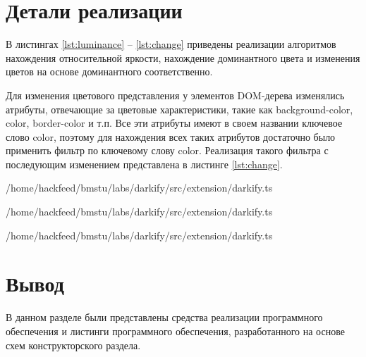\section{Детали реализации}

В листингах \ref{lst:luminance} -- \ref{lst:change} приведены реализации алгоритмов нахождения относительной яркости, нахождение доминантного цвета и изменения цветов на основе доминантного соответственно. 

Для изменения цветового представления у элементов DOM-дерева изменялись атрибуты, отвечающие за цветовые характеристики, такие как background-color, color, border-color и т.п. Все эти атрибуты имеют в своем названии ключевое слово color, поэтому для нахождения всех таких атрибутов достаточно было применить фильтр по ключевому слову color. Реализация такого фильтра с последующим изменением представлена в листинге \ref{lst:change}.

\begin{lstinputlisting}[
	caption={Реализация алгоритма нахождения относительной яркости},
	label={lst:luminance},
	style={ES6},
	linerange={80-91},
	]{/home/hackfeed/bmstu/labs/darkify/src/extension/darkify.ts}
\end{lstinputlisting}

\begin{lstinputlisting}[
	caption={Реализация алгоритма нахождения доминантного цвета},
	label={lst:domcolor},
	style={ES6},
	linerange={100-127},
	]{/home/hackfeed/bmstu/labs/darkify/src/extension/darkify.ts}
\end{lstinputlisting}

\begin{lstinputlisting}[
	caption={Реализация алгоритма подбора цветов на основе базовго},
	label={lst:change},
	style={ES6},
	linerange={128-173},
	]{/home/hackfeed/bmstu/labs/darkify/src/extension/darkify.ts}
\end{lstinputlisting}

\section*{Вывод}

В данном разделе были представлены средства реализации программного обеспечения и листинги программного обеспечения, разработанного на основе схем конструкторского раздела.
